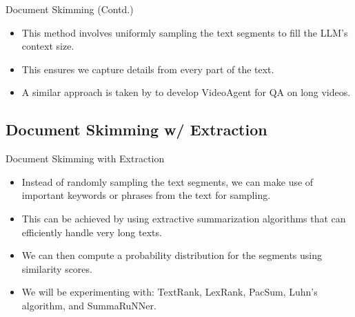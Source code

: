 \begin{frame}{Document Skimming (Contd.)}

	\begin{itemize}
		\item This method involves uniformly sampling the text segments to fill the LLM's
		context size.
		\item<3-> This ensures we capture details from every part of the text.
		\item<4> A similar approach is taken by \citet{wang2024videoagent} to develop
		VideoAgent for QA on long videos.
	\end{itemize}



\end{frame}


\subsection{Document Skimming w/ Extraction}

\begin{frame}{Document Skimming with Extraction}

	\begin{itemize}
		\item Instead of randomly sampling the text segments, we can make use of important
		keywords or phrases from the text for sampling.
		\item<2-> This can be achieved by using extractive summarization algorithms that can
		efficiently handle very long texts.
		\item<3-> We can then compute a probability distribution for the segments using
		similarity scores.
		\item<4> We will be experimenting with: TextRank, LexRank, PacSum, Luhn's algorithm,
		and SummaRuNNer.
	\end{itemize}

\end{frame}


